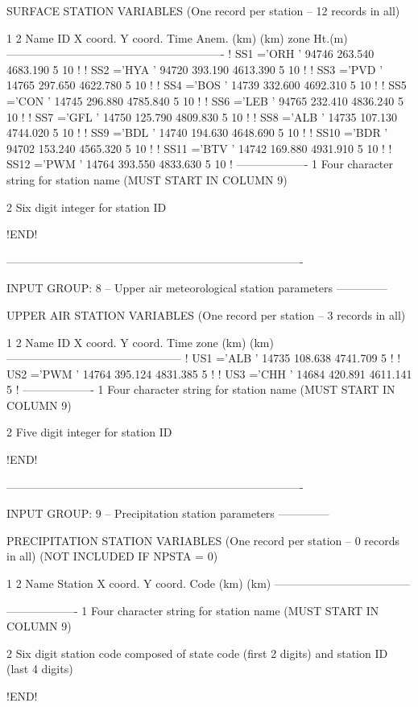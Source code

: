 \documentclass[a4paper,10pt]{article}
\begin{document}
     SURFACE STATION VARIABLES
     (One record per station --  12  records in all)


             1     2
         Name   ID            X coord.   Y coord.   Time   Anem.
                               (km)       (km)      zone   Ht.(m)
       ----------------------------------------------------------
! SS1  ='ORH '    94746       263.540     4683.190    5    10  !
! SS2  ='HYA '    94720       393.190     4613.390    5    10  !
! SS3  ='PVD '    14765       297.650     4622.780    5    10  !
! SS4  ='BOS '    14739       332.600     4692.310    5    10  !
! SS5  ='CON '    14745       296.880     4785.840    5    10  !
! SS6  ='LEB '    94765       232.410     4836.240    5    10  !
! SS7  ='GFL '    14750       125.790     4809.830    5    10  !
! SS8  ='ALB '    14735       107.130     4744.020    5    10  !
! SS9  ='BDL '    14740       194.630     4648.690    5    10  !
! SS10 ='BDR '    94702       153.240     4565.320    5    10  !
! SS11 ='BTV '    14742       169.880     4931.910    5    10  !
! SS12 ='PWM '    14764       393.550     4833.630    5    10  !
-------------------
      1
        Four character string for station name
        (MUST START IN COLUMN 9)

      2
        Six digit integer for station ID

!END!


-------------------------------------------------------------------------------

INPUT GROUP: 8 -- Upper air meteorological station parameters
--------------

     UPPER AIR STATION VARIABLES
     (One record per station --  3  records in all)

             1     2
         Name    ID      X coord.   Y coord.  Time zone
                           (km)       (km)    
        -----------------------------------------------
! US1  ='ALB '   14735    108.638   4741.709    5  !
! US2  ='PWM '   14764    395.124   4831.385    5  !
! US3  ='CHH '   14684    420.891   4611.141    5  !
-------------------
      1
        Four character string for station name
        (MUST START IN COLUMN 9)

      2
        Five digit integer for station ID

!END!


-------------------------------------------------------------------------------

INPUT GROUP: 9 -- Precipitation station parameters
--------------

     PRECIPITATION STATION VARIABLES
     (One record per station --  0  records in all)
     (NOT INCLUDED IF NPSTA = 0)

            1          2
         Name   Station    X coord.  Y coord.
                  Code       (km)      (km)
         ------------------------------------


-------------------
      1
        Four character string for station name
        (MUST START IN COLUMN 9)

      2
        Six digit station code composed of state
        code (first 2 digits) and station ID (last
        4 digits)

!END!
\end{document}

